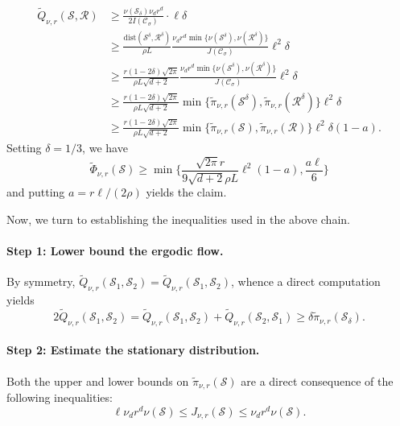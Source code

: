 \documentclass{report}
\newcommand{\1}{\mathbf{1}}
\newcommand{\mc}[1]{\mathcal{#1}}
\newcommand{\wt}[1]{\widetilde{#1}}
\newcommand{\dist}{\mathrm{dist}}
\theoremstyle{alden}
\theoremstyle{aldenthm}
\theoremstyle{definition}
\theoremstyle{remark}
\begin{document}
\begin{align*}
\wt{Q}_{\nu,r}(\mc{S},\mc{R}) & \geq \frac{\nu(\mc{S}_{\delta})\nu_dr^d}{2I(\mc{C}_{\sigma})} \cdot \ell \delta \tag{Step 2} \\
& \geq \frac{\dist(\mc{S}^{\delta},\mc{R}^{\delta})}{\rho L} \frac{\nu_dr^d\min\{\nu(\mc{S}^{\delta}),\nu(\mc{R}^{\delta})\}}{J(\mc{C}_{\sigma})}  \ell^2 \delta \tag{Step 3}\\
& \geq \frac{r (1 - 2\delta)\sqrt{2\pi}}{\rho L\sqrt{d + 2}} \frac{\nu_dr^d \min\{\nu(\mc{S}^{\delta}),\nu(\mc{R}^{\delta})\}}{J(\mc{C}_{\sigma})}  \ell^2 \delta \tag{Step 4} \\
& \geq  \frac{r (1 - 2\delta)\sqrt{2\pi}}{\rho L\sqrt{d + 2}} \min\bigl\{\wt{\pi}_{\nu,r}(\mc{S}^{\delta}),\wt{\pi}_{\nu,r}(\mc{R}^{\delta})\bigr\} \ell^2 \delta \tag{Step 2} \\
& \geq \frac{r (1 - 2\delta)\sqrt{2\pi}}{\rho L\sqrt{d + 2}} \min\bigl\{\wt{\pi}_{\nu,r}(\mc{S}),\wt{\pi}_{\nu,r}(\mc{R})\bigr\}   \ell^2 \delta (1 - a). \tag{by hypothesis}
\end{align*}
Setting $\delta = 1/3$, we have
\begin{equation*}
\wt{\Phi}_{\nu,r}(\mc{S}) \geq \min\biggl\{\frac{\sqrt{2\pi} r}{9\sqrt{d + 2} \rho L} \ell^2(1 - a), \frac{a\ell}{6}\biggr\}
\end{equation*}
and putting $a = r\ell/(2\rho)$ yields the claim.

Now, we turn to establishing the inequalities used in the above chain.

\paragraph{Step 1: Lower bound the ergodic flow.}
By symmetry, $\wt{Q}_{\nu,r}(\mc{S}_1,\mc{S}_2) = \wt{Q}_{\nu,r}(\mc{S}_1,\mc{S}_2)$, whence a direct computation yields
\begin{equation*}
2\wt{Q}_{\nu,r}(\mc{S}_1,\mc{S}_2) = \wt{Q}_{\nu,r}(\mc{S}_1,\mc{S}_2) + \wt{Q}_{\nu,r}(\mc{S}_2,\mc{S}_1) \geq \delta \wt{\pi}_{\nu,r}(\mc{S}_{\delta}).
\end{equation*}

\paragraph{Step 2: Estimate the stationary distribution.}

Both the upper and lower  bounds on $\wt{\pi}_{\nu,r}(\mc{S})$ are a direct consequence of the following inequalities:
\begin{equation*}
\ell \nu_d r^d \nu(\mc{S})  \leq {J}_{\nu,r}(\mc{S}) \leq \nu_d r^d \nu(\mc{S}).
\end{equation*}
\end{document}
